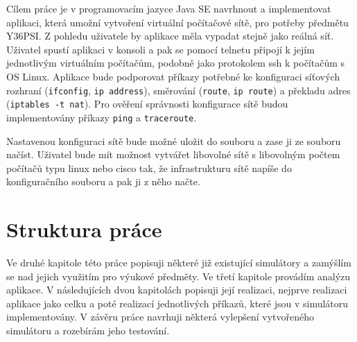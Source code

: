 Cílem práce je v programovacím jazyce Java SE navrhnout a implementovat aplikaci, která umožní vytvoření virtuální počítačové sítě, pro potřeby předmětu Y36PSI. Z pohledu uživatele by aplikace měla vypadat stejně jako reálná síť. Uživatel spustí aplikaci v konsoli a pak se pomocí telnetu připojí k jejím jednotlivým virtuálním počítačům, podobně jako protokolem ssh k počítačům s OS Linux. Aplikace bude podporovat příkazy potřebné ke konfiguraci síťových rozhraní (\verb|ifconfig|, \verb|ip address|), směrování (\verb|route|, \verb|ip route|) a překladu adres (\verb|iptables -t nat|). Pro ověření správnosti konfigurace sítě budou implementovány příkazy \verb|ping| a \verb|traceroute|.

Nastavenou konfiguraci sítě bude možné uložit do souboru a zase ji ze souboru načíst. Uživatel bude mít možnost vytvářet libovolné sítě s libovolným počtem počítačů typu linux nebo cisco tak, že infrastrukturu sítě napíše do konfiguračního souboru a pak ji z něho načte.


% 


\section{Struktura práce}

Ve druhé kapitole této práce popisuji některé již existující simulátory a zamýšlím se nad jejich využitím pro výukové předměty. Ve třetí kapitole provádím analýzu aplikace. V následujících dvou kapitolách popisuji její realizaci, nejprve realizaci aplikace jako celku a poté realizací jednotlivých příkazů, které jsou v simulátoru implementovány. V závěru práce navrhuji některá vylepšení vytvořeného simulátoru a rozebírám jeho testování.



